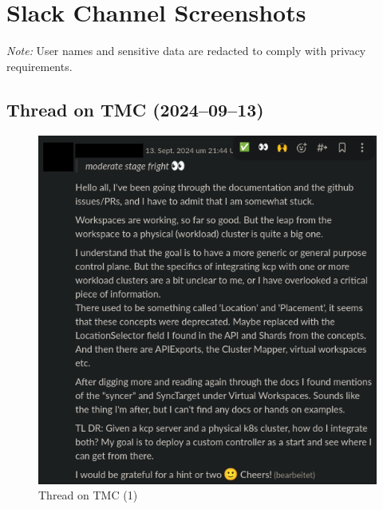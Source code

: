 \documentclass[11pt, a4paper, oneside, listof=totoc]{scrartcl}
\begin{document}
        \clearpage

        \section{Slack Channel Screenshots}\label{app:slack}

            \noindent\textit{Note:} User names and sensitive data are redacted to comply with privacy requirements.

            \subsection{Thread on TMC (2024--09--13)}
                \begin{figure}[h!]
                    \centering
                    \includegraphics[width=\textwidth]{screenshots/slack/tmc1.anonymized.png}
                    \caption{Thread on TMC (1)}\label{fig:tmc1}
                \end{figure}
\end{document}
